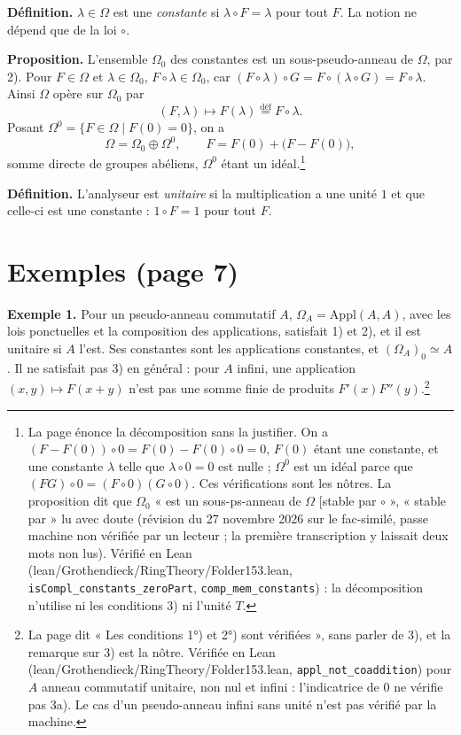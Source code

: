 \documentclass[11pt,a4paper]{article}
\begin{document}
\textbf{Définition.} $\lambda \in \Omega$ est une \emph{constante} si
$\lambda \circ F = \lambda$ pour tout $F$. La notion ne dépend que de la loi
$\circ$.

\textbf{Proposition.} L'ensemble $\Omega_{0}$ des constantes est un
sous-pseudo-anneau de $\Omega$, par 2). Pour $F \in \Omega$ et $\lambda \in
\Omega_{0}$, $F \circ \lambda \in \Omega_{0}$, car
$(F \circ \lambda) \circ G = F \circ (\lambda \circ G) = F \circ \lambda$. Ainsi
$\Omega$ opère sur $\Omega_{0}$ par
\[
(F, \lambda) \longmapsto F(\lambda) \overset{\text{déf}}{=} F \circ \lambda .
\]
Posant $\Omega^{0} = \{F \in \Omega \mid F(0) = 0\}$, on a
\[
\Omega = \Omega_{0} \oplus \Omega^{0},
\qquad F = F(0) + \bigl(F - F(0)\bigr),
\]
somme directe de groupes abéliens, $\Omega^{0}$ étant un idéal.\footnote{La page
énonce la décomposition sans la justifier. On a $(F - F(0)) \circ 0 = F(0) -
F(0) \circ 0 = 0$, $F(0)$ étant une constante, et une constante $\lambda$ telle
que $\lambda \circ 0 = 0$ est nulle ; $\Omega^{0}$ est un idéal parce que
$(FG) \circ 0 = (F \circ 0)(G \circ 0)$. Ces vérifications sont les nôtres. La
proposition dit que $\Omega_{0}$ « est un sous-ps-anneau de $\Omega$ [stable par
$\circ$ », « stable par » lu avec doute (révision du 27 novembre 2026 sur le
fac-similé, passe machine non vérifiée par un lecteur ; la première
transcription y laissait deux mots non lus). Vérifié en Lean (lean/Grothendieck/RingTheory/Folder153.lean,
\texttt{isCompl\_constants\_zeroPart}, \texttt{comp\_mem\_constants}) : la
décomposition n'utilise ni les conditions 3) ni l'unité $T$.}

\textbf{Définition.} L'analyseur est \emph{unitaire} si la multiplication a une
unité $1$ et que celle-ci est une constante : $1 \circ F = 1$ pour tout $F$.

\section*{Exemples (page 7)}

\textbf{Exemple 1.} Pour un pseudo-anneau commutatif $A$, $\Omega_{A} =
\mathrm{Appl}(A, A)$, avec les lois ponctuelles et la composition des
applications, satisfait 1) et 2), et il est unitaire si $A$ l'est. Ses constantes
sont les applications constantes, et $(\Omega_{A})_{0} \simeq A$. Il ne satisfait
pas 3) en général : pour $A$ infini, une application $(x, y) \mapsto F(x + y)$
n'est pas une somme finie de produits $F'(x)F''(y)$.\footnote{La page dit
« Les conditions 1°) et 2°) sont vérifiées », sans parler de 3), et la
remarque sur 3) est la nôtre. Vérifiée en Lean
(lean/Grothendieck/RingTheory/Folder153.lean, \texttt{appl\_not\_coaddition}) pour $A$
anneau commutatif unitaire, non nul et infini : l'indicatrice de $0$ ne
vérifie pas 3a). Le cas d'un pseudo-anneau infini sans unité n'est pas
vérifié par la machine.}
\end{document}
